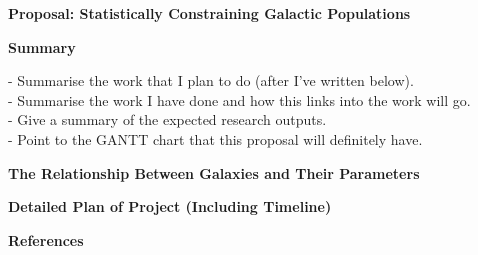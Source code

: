 \documentclass[12pt,usenatbib]{article}
\author{David O'Ryan}
\begin{document}
    \begin{center}
        \textbf{\Large{{Proposal: Statistically Constraining Galactic Populations}}}
    \end{center}

\begin{center}
    \noindent \large{\textbf{Summary}}
\end{center}
\noindent - Summarise the work that I plan to do (after I've written below). \\
\noindent - Summarise the work I have done and how this links into the work will go. \\
\noindent - Give a summary of the expected research outputs. \\
\noindent - Point to the GANTT chart that this proposal will definitely have. \\

\begin{center}
    \noindent \large{\textbf{}}
\end{center}

\begin{center}
    \noindent \large{\textbf{The Relationship Between Galaxies and Their Parameters}}
\end{center}


\begin{center}
    \noindent \large{\textbf{Detailed Plan of Project (Including Timeline)}}
\end{center}

\vspace{-5mm}
\begin{center}
    \noindent \large{\textbf{References}}\\
    {}
\end{center}


%
%
\end{document}
